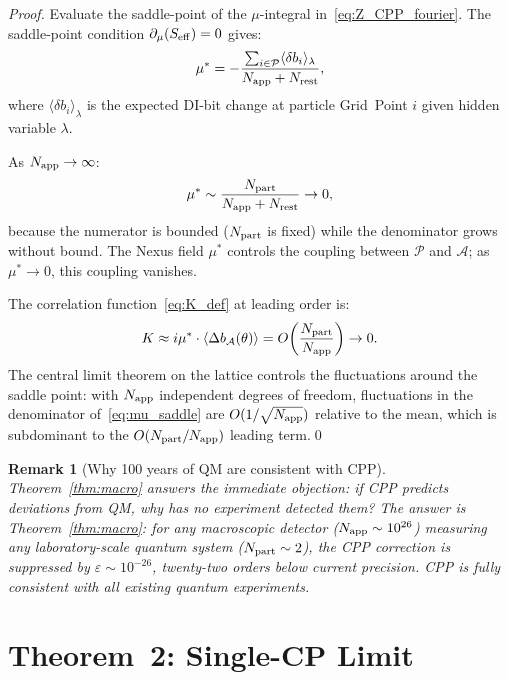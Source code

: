 \documentclass[11pt,a4paper]{article}
\newtheorem{remark}[theorem]{Remark}
\newcommand{\eps}{\varepsilon}
\newcommand{\Napp}{N_{\rm app}}
\newcommand{\Npart}{N_{\rm part}}
\begin{document}
\begin{proof}
Evaluate the saddle-point of the $\mu$-integral in~\eqref{eq:Z_CPP_fourier}.
The saddle-point condition $\partial_\mu(S_{\rm eff}) = 0$ gives:
\begin{equation}
\mu^* = -\frac{\sum_{i\in\mathcal{P}}\langle\delta b_i\rangle_\lambda}
             {\Napp + N_{\rm rest}},
\label{eq:mu_saddle}
\end{equation}
where $\langle\delta b_i\rangle_\lambda$ is the expected DI-bit
change at particle Grid~Point $i$ given hidden variable $\lambda$.

As $\Napp \to \infty$:
\begin{equation}
\mu^* \sim \frac{\Npart}{\Napp + N_{\rm rest}} \to 0,
\label{eq:mu_zero}
\end{equation}
because the numerator is bounded ($\Npart$ is fixed) while the
denominator grows without bound.  The Nexus field $\mu^*$ controls
the coupling between $\mathcal{P}$ and $\mathcal{A}$; as $\mu^* \to
0$, this coupling vanishes.

The correlation function~\eqref{eq:K_def} at leading order is:
\begin{equation}
K \approx i\mu^* \cdot \langle\Delta b_{\mathcal{A}}(\theta)\rangle
= O\!\left(\frac{\Npart}{\Napp}\right) \to 0.
\label{eq:K_leading}
\end{equation}
The central limit theorem on the lattice controls the fluctuations
around the saddle point: with $\Napp$ independent degrees of freedom,
fluctuations in the denominator of~\eqref{eq:mu_saddle} are
$O(1/\sqrt{\Napp})$ relative to the mean, which is subdominant
to the $O(\Npart/\Napp)$ leading term.\qed
\end{proof}

\begin{remark}[Why 100 years of QM are consistent with CPP]
Theorem~\ref{thm:macro} answers the immediate objection: if CPP
predicts deviations from QM, why has no experiment detected them?
The answer is Theorem~\ref{thm:macro}: for any macroscopic
detector ($\Napp \sim 10^{26}$) measuring any laboratory-scale
quantum system ($\Npart \sim 2$), the CPP correction is suppressed
by $\eps \sim 10^{-26}$, twenty-two orders below current precision.
CPP is fully consistent with all existing quantum experiments.
\end{remark}

\section{Theorem~2: Single-CP Limit}
\label{sec:single}
\end{document}
